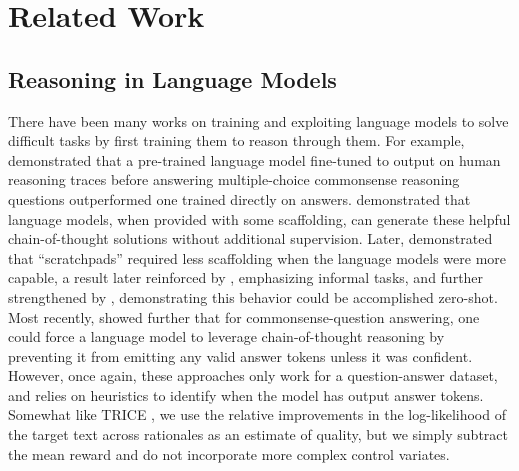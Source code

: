 \documentclass{article} %
\begin{document}
\section{Related Work}
\subsection{Reasoning in Language Models}
There have been many works on training and exploiting language models to solve difficult tasks by first training them to reason through them. For example, \citet{rajani2019explain} demonstrated that a pre-trained language model fine-tuned to output on human reasoning traces before answering multiple-choice commonsense reasoning questions outperformed one trained directly on answers. \citet{shwartz2020unsupervised} demonstrated that language models, when provided with some scaffolding, can generate these helpful chain-of-thought solutions without additional supervision. Later, \citet{nye2021show} demonstrated that ``scratchpads'' required less scaffolding when the language models were more capable, a result later reinforced by \citet{wei_chain_2022}, emphasizing informal tasks, and further strengthened by \citet{kojima_large_2022}, demonstrating this behavior could be accomplished zero-shot. Most recently, \citet{wang2024chain} showed further that for commonsense-question answering, one could force a language model to leverage chain-of-thought reasoning by preventing it from emitting any valid answer tokens unless it was confident. However, once again, these approaches only work for a question-answer dataset, and \citet{wang2024chain} relies on heuristics to identify when the model has output answer tokens. Somewhat like TRICE \citep{phan2023training}, we use the relative improvements in the log-likelihood of the target text across rationales as an estimate of quality, but we simply subtract the mean reward and do not incorporate more complex control variates.
\end{document}
